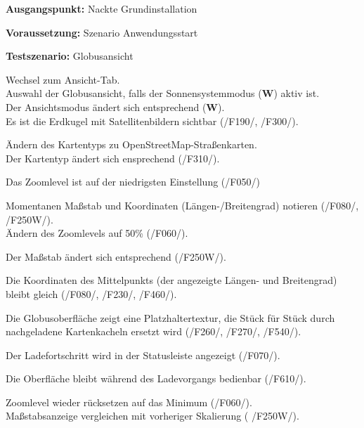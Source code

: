 \documentclass[10pt]{scrreprt}
\newcommand{\sfbf}[1]{\textbf{\sffamily #1}}
\newcommand{\W}{\sfbf{W}}
\newcommand{\ziel}[1]{{\fontsize{9.5}{11}\textsf{/#1/}}}
\newenvironment{details}[1][6pt]{%
  \parskip#1 \parindent6mm \raggedright%
  \def\item{\par\ignorespaces\hangindent=5mm \hangafter1}}{%
  \par\ignorespaces}
\begin{document}
\newpage
\vspace{1.0cm}
\begin{details}[2pt]
\item \sfbf{Ausgangspunkt:} Nackte Grundinstallation 
\item \sfbf{Voraussetzung:} Szenario Anwendungsstart
\item \sfbf{Testszenario:} Globusansicht
\end{details}
\vspace{2mm}
\begin{enumerate}[leftmargin = 2.2cm, resume]
\item Wechsel zum Ansicht-Tab.\\
Auswahl der Globusansicht, falls der Sonnensystemmodus (\W) aktiv ist.\\Der Ansichtsmodus ändert sich entsprechend (\W).\\
Es ist die Erdkugel mit Satellitenbildern sichtbar (\ziel{F190}, \ziel{F300}).
\item Ändern des Kartentyps zu OpenStreetMap-Straßenkarten.\\Der Kartentyp ändert sich ensprechend (\ziel{F310}).
\item Das Zoomlevel ist auf der niedrigsten Einstellung (\ziel{F050})
\item Momentanen Maßstab und Koordinaten (Längen-/Breitengrad) notieren (\ziel{F080}, \ziel{F250W}).\\Ändern des Zoomlevels auf 50\% (\ziel{F060}).\item Der Maßstab ändert sich entsprechend (\ziel{F250W}).
\item Die Koordinaten des Mittelpunkts (der angezeigte Längen- und Breitengrad) bleibt gleich (\ziel{F080}, \ziel{F230}, \ziel{F460}).
\item Die Globusoberfläche zeigt eine Platzhaltertextur, die Stück für Stück durch nachgeladene Kartenkacheln ersetzt wird (\ziel{F260}, \ziel{F270}, \ziel{F540}).
\item Der Ladefortschritt wird in der Statusleiste angezeigt (\ziel{F070}). \item Die Oberfläche bleibt während des Ladevorgangs bedienbar (\ziel{F610}).
\item Zoomlevel wieder rücksetzen auf das Minimum (\ziel{F060}).\\ Maßstabsanzeige vergleichen mit vorheriger Skalierung ( \ziel{F250W}).
\end{enumerate}
\end{document}
